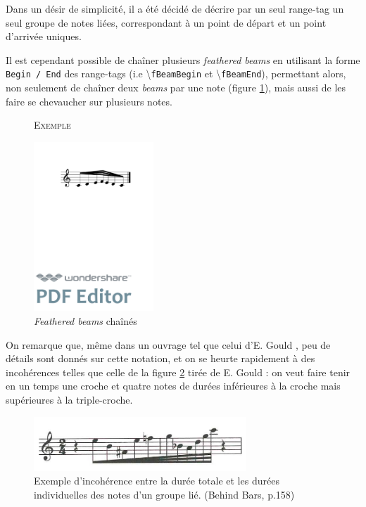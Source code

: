 \documentclass{article}
\newenvironment{gmncode}	{\vspace{-2mm}\small\verbatim}{\endverbatim\vspace{-2mm}}
\newcommand{\code}[1]		{{\small \texttt{#1}}}
\newcommand{\guidotag}[1]	{\textbackslash\code{#1}}
\newcommand{\exemple}		{\vspace{2mm}\hspace*{-6mm}\textsc{Exemple}}
\begin{document}
Dans un désir de simplicité, il a été décidé de décrire par un seul range-tag un seul groupe de notes liées, correspondant à un point de départ et un point d'arrivée uniques.

Il est cependant possible de chaîner plusieurs \emph{feathered beams} en utilisant la forme \code{Begin / End} des range-tags (i.e \guidotag{fBeamBegin} et \guidotag{fBeamEnd}), permettant alors, non seulement de chaîner deux \emph{beams} par une note (figure \ref{fig:fbeamchain}), mais aussi de les faire se chevaucher sur plusieurs notes.

\begin{figure}[h]
\exemple
\begin{gmncode}
[ 
  \fBeamBegin:1 c/8 d e/16 
  \fBeamBegin:2 f/32 \fBeamEnd:1 
  e/16 d/8 c \fBeamEnd:2 
]
\end{gmncode}

\begin{center}
\includegraphics[width=45mm]{img/fBeamChaine.pdf}
\end{center}
\caption{\emph{Feathered beams} chaînés}
\label{fig:fbeamchain}
\end{figure}

\bigskip
On remarque que, même dans un ouvrage tel que celui d'E. Gould \cite{gould2011behind}, peu de détails sont donnés sur cette notation, et on se heurte rapidement à des incohérences telles que celle de la figure \ref{fig:incoherence} tirée de E. Gould \cite{gould2011behind} : on veut faire tenir en un temps une croche et quatre notes de durées inférieures à la croche mais supérieures à la triple-croche. 

\begin{figure}[h]
\centering
\includegraphics[width=8cm]{img/behindbars.jpg}
\caption{Exemple d'incohérence entre la durée totale et les durées individuelles des notes d'un groupe lié. (Behind Bars, p.158) }
\label{fig:incoherence}
\end{figure}
\end{document}
